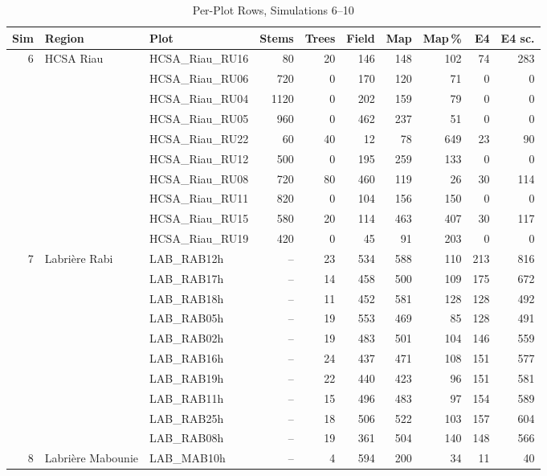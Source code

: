 \documentclass[conference,a4paper]{IEEEtran}
\begin{document}
\begin{table}[!t]
\centering
\caption{Per-Plot Rows, Simulations 6--10}
\label{tab:rows2}
\scriptsize
\setlength{\tabcolsep}{4pt}
\begin{tabular}{@{}r l l r r r r r r r@{}}
\toprule
\textbf{Sim} & \textbf{Region} & \textbf{Plot} & \textbf{Stems} & \textbf{Trees} & \textbf{Field} & \textbf{Map} & \textbf{Map\,\%} & \textbf{E4} & \textbf{E4 sc.}\\
\midrule
6 & HCSA Riau & HCSA\_Riau\_RU16 & 80 & 20 & 146 & 148 & 102 & 74 & 283\\
 &  & HCSA\_Riau\_RU06 & 720 & 0 & 170 & 120 & 71 & 0 & 0\\
 &  & HCSA\_Riau\_RU04 & 1120 & 0 & 202 & 159 & 79 & 0 & 0\\
 &  & HCSA\_Riau\_RU05 & 960 & 0 & 462 & 237 & 51 & 0 & 0\\
 &  & HCSA\_Riau\_RU22 & 60 & 40 & 12 & 78 & 649 & 23 & 90\\
 &  & HCSA\_Riau\_RU12 & 500 & 0 & 195 & 259 & 133 & 0 & 0\\
 &  & HCSA\_Riau\_RU08 & 720 & 80 & 460 & 119 & 26 & 30 & 114\\
 &  & HCSA\_Riau\_RU11 & 820 & 0 & 104 & 156 & 150 & 0 & 0\\
 &  & HCSA\_Riau\_RU15 & 580 & 20 & 114 & 463 & 407 & 30 & 117\\
 &  & HCSA\_Riau\_RU19 & 420 & 0 & 45 & 91 & 203 & 0 & 0\\
\midrule
7 & Labri\`ere Rabi & LAB\_RAB12h & -- & 23 & 534 & 588 & 110 & 213 & 816\\
 &  & LAB\_RAB17h & -- & 14 & 458 & 500 & 109 & 175 & 672\\
 &  & LAB\_RAB18h & -- & 11 & 452 & 581 & 128 & 128 & 492\\
 &  & LAB\_RAB05h & -- & 19 & 553 & 469 & 85 & 128 & 491\\
 &  & LAB\_RAB02h & -- & 19 & 483 & 501 & 104 & 146 & 559\\
 &  & LAB\_RAB16h & -- & 24 & 437 & 471 & 108 & 151 & 577\\
 &  & LAB\_RAB19h & -- & 22 & 440 & 423 & 96 & 151 & 581\\
 &  & LAB\_RAB11h & -- & 15 & 496 & 483 & 97 & 154 & 589\\
 &  & LAB\_RAB25h & -- & 18 & 506 & 522 & 103 & 157 & 604\\
 &  & LAB\_RAB08h & -- & 19 & 361 & 504 & 140 & 148 & 566\\
\midrule
8 & Labri\`ere Mabounie & LAB\_MAB10h & -- & 4 & 594 & 200 & 34 & 11 & 40\\

\end{tabular}
\end{table}
\end{document}
